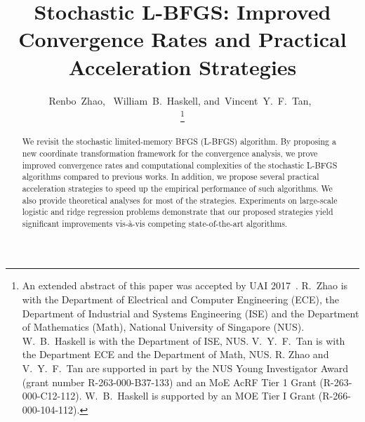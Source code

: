 \documentclass[10pt,twocolumn,journal]{IEEEtran}
\begin{document}
\title{Stochastic L-BFGS: Improved Convergence Rates and Practical Acceleration Strategies}

\author{Renbo~Zhao,~
		William~B.~Haskell, 
        and~Vincent~Y.~F.~Tan,~
        


\thanks{An extended abstract of this paper was accepted by UAI 2017~\cite{Zhao_17d}. 
R.~Zhao is with the Department of Electrical and Computer Engineering (ECE), the Department of Industrial and Systems Engineering (ISE) and the Department of Mathematics (Math), National University of Singapore (NUS). W.~B.~Haskell is with the Department of ISE, NUS. V.~Y.~F.~Tan is with the Department ECE and the Department of Math, NUS. R. Zhao and V.~Y.~F.~Tan are supported in part by the NUS Young Investigator Award (grant number R-263-000-B37-133) and an MoE AcRF Tier 1 Grant (R-263-000-C12-112).  W.~B.~Haskell is supported by an MOE Tier I Grant (R-266-000-104-112). }
}



\maketitle

\begin{abstract}
We revisit the stochastic limited-memory BFGS (L-BFGS) algorithm. By proposing a new coordinate transformation framework for the convergence analysis, we prove improved  convergence rates and computational complexities of the stochastic L-BFGS algorithms compared to previous works. %
 In addition, we propose several practical acceleration strategies to speed up the empirical performance of such algorithms. We also provide theoretical analyses for most of the strategies. Experiments on {large-scale} logistic and ridge regression problems demonstrate that our proposed strategies yield significant improvements vis-\`a-vis  {competing  state-of-the-art algorithms}. 
\end{abstract}
\end{document}
